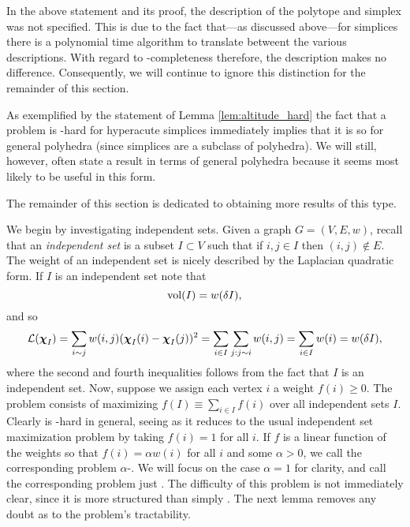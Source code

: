\begin{remark} In  the above statement and its proof, the description of the polytope and simplex was not specified. This is due to the fact that---as discussed above---for simplices there is a polynomial time algorithm to translate betweent the various descriptions. With regard to \NP-completeness therefore, the description makes no difference. Consequently, we will continue to ignore this distinction for the remainder of this section. 
\end{remark}

\begin{remark}
	As exemplified by the statement of Lemma \ref{lem:altitude_hard} the fact that a problem is \NP-hard for hyperacute simplices immediately implies that it is so for general polyhedra (since simplices are a subclass of polyhedra). We will still, however, often state a result in terms of general polyhedra because it seems most likely to be useful in this form. 
\end{remark}

The remainder of this section is dedicated to obtaining more results of this type. 

We begin by investigating independent sets. Given a graph $G=(V,E,w)$, recall that an \emph{independent set} is a subset $I\subset V$ such that if $i,j\in I$ then $(i,j)\notin E$. 
The weight of an independent set is nicely described by the Laplacian quadratic form. If $I$ is an independent set note that 
\[\textnormal{vol}(I) = w(\delta I),\] 
and so 
\begin{align*}
    \mathcal{L}(\boldsymbol{\chi}_I) = \sum_{i\sim j}w(i,j)(\boldsymbol{\chi}_I(i)-\boldsymbol{\chi}_I(j))^2 = \sum_{i\in I}\sum_{j:j\sim i} w(i,j) = \sum_{i\in I}w(i)=w(\delta I),
\end{align*}
where the second and fourth inequalities follows from the fact that $I$ is an independent set. Now, suppose we assign each vertex $i$ a weight $f(i)\geq 0$. The \mwis problem consists of maximizing $f(I)\equiv \sum_{i\in I}f(i)$ over all independent sets $I$. Clearly \mwis is \NP-hard in general, seeing as it reduces to the usual independent set maximization problem by taking $f(i)=1$ for all $i$. If $f$ is a linear function of the weights so that $f(i)=\alpha w(i)$ for all $i$ and some $\alpha> 0$, we call the corresponding problem $\alpha$-\vwis. We will focus on the case $\alpha=1$ for clarity, and call the  corresponding problem just \vwis. The difficulty of this problem is not immediately clear, since it is more structured than simply \mwis. The next lemma removes any doubt as to the problem's tractability.   

